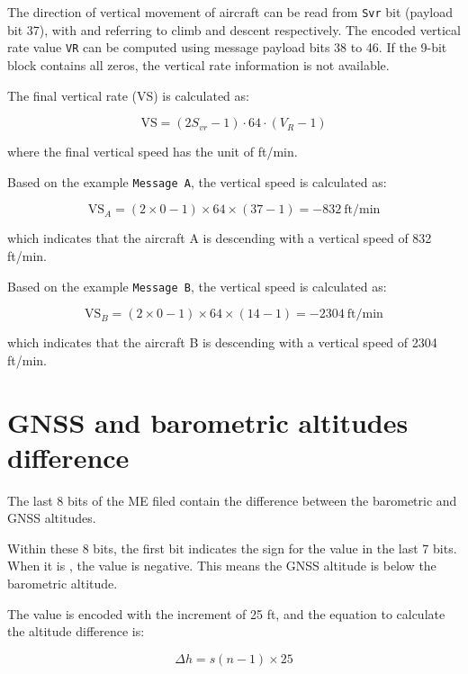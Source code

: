 The direction of vertical movement of aircraft can be read from \texttt{Svr} bit (payload bit 37), with \0 and \1 referring to climb and descent respectively. The encoded vertical rate value \texttt{VR} can be computed using message payload bits 38 to 46. If the 9-bit block contains all zeros, the vertical rate information is not available.

The final vertical rate ($\mathrm{VS}$) is calculated as:

\begin{equation}
  \mathrm{VS} = (2S_{vr} - 1) \cdot 64 \cdot (V_R - 1)
\end{equation}

where the final vertical speed has the unit of ft/min.

Based on the example \texttt{Message A}, the vertical speed is calculated as:

\begin{equation}
  \mathrm{VS}_A = (2 \times 0 - 1) \times 64 \times (37 -1) = -832 ~\text{ft/min}
\end{equation}

which indicates that the aircraft A is descending with a vertical speed of 832 ft/min.

Based on the example \texttt{Message B}, the vertical speed is calculated as:

\begin{equation}
  \mathrm{VS}_B = (2 \times 0 - 1) \times 64 \times (14 -1) = -2304 ~\text{ft/min}
\end{equation}

which indicates that the aircraft B is descending with a vertical speed of 2304 ft/min.


\section{GNSS and barometric altitudes difference}

The last 8 bits of the ME filed contain the difference between the barometric and GNSS altitudes. 

Within these 8 bits, the first bit indicates the sign for the value in the last 7 bits. When it is \1, the value is negative. This means the GNSS altitude is below the barometric altitude.

The value is encoded with the increment of 25 ft, and the equation to calculate the altitude difference is:

\begin{equation}
  \Delta h = s (n - 1) \times 25
\end{equation}

